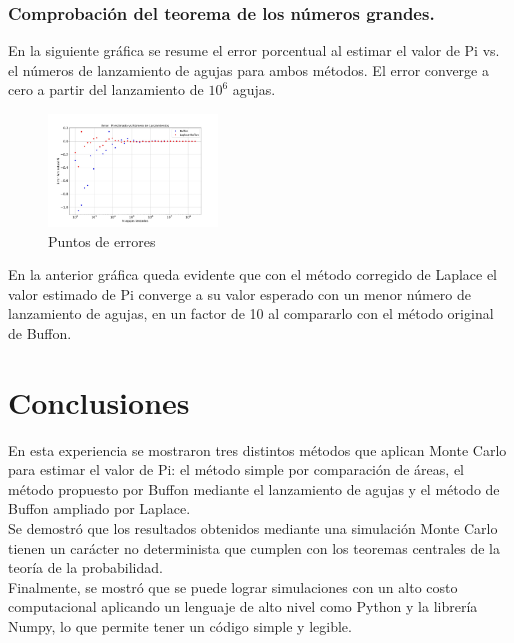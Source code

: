 \documentclass{rbf}
\begin{document}
\subsubsection{Comprobación del teorema de los números grandes.}
En la siguiente gráfica se resume el error porcentual al estimar el valor de Pi vs. el números de lanzamiento de agujas para ambos métodos. El error converge a cero a partir del lanzamiento de $10^6$ agujas.
\begin{figure}[tbp!]
 \centering
  \includegraphics[width=0.4\textwidth]{figures/Errores.jpg}
	\caption{Puntos de errores}
 \label{buff}
\end{figure}
En la anterior gráfica queda evidente que con el método corregido de Laplace el valor estimado de Pi converge a su valor esperado con un menor número de lanzamiento de agujas, en un factor de 10 al compararlo con el método original de Buffon. 


\section{Conclusiones}

En esta experiencia se mostraron tres distintos métodos que aplican Monte Carlo para estimar el valor de Pi: el método simple por comparación de áreas, el método propuesto por Buffon mediante el lanzamiento de agujas y el método de Buffon ampliado por Laplace. \\
Se demostró que los resultados obtenidos mediante una simulación Monte Carlo tienen un carácter no determinista que cumplen con los teoremas centrales de la teoría de la probabilidad. \\

Finalmente, se mostró que se puede lograr simulaciones con un alto costo computacional aplicando un lenguaje de alto nivel como Python y la librería Numpy, lo que permite tener un código simple y legible.



                                                                     
\end{document}
